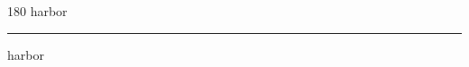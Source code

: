 
\begin{frame}
\begin{center}
\begin{turn}{180}
{\fontsize{2.5cm}{1em}\selectfont harbor}
\end{turn}
\vspace{1em}\par  
\hrule
\vspace{1em}\par  
{\fontsize{2.5cm}{1em}\selectfont harbor}
\end{center}
\end{frame}
